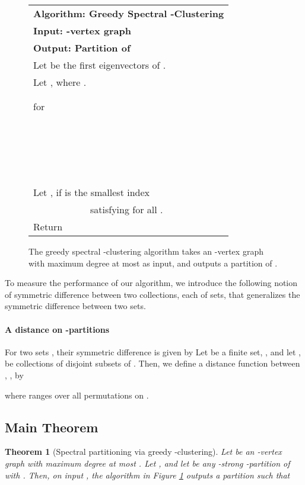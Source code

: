 \documentclass[11pt]{article}
\theoremstyle{plain}
\newtheorem{theorem}{Theorem}[section]
\begin{document}
\begin{figure}
\begin{center}
\begin{tabularx}{\textwidth}{l}
\toprule
\textbf{Algorithm: Greedy Spectral -Clustering}\\
\textbf{Input: -vertex graph }\\
\textbf{Output: Partition  of }\\
\midrule
Let  be the  first eigenvectors of . \\
Let , where . \\
 \\
 \\
for  \\
~~~~~~~~\\
~~~~~~~~~~~~ \\
~~~~~~~~ \\
~~~~~~~~ \\
Let ,  if  is the smallest index \\
~~~~~~~~~~~~satisfying  for all . \\
Return  \\
\bottomrule
\end{tabularx}
\end{center}
\caption{The greedy spectral -clustering algorithm takes an -vertex graph
 with maximum degree at most  as input, and
outputs a partition  of .
\label{fig:algorithm}}
\end{figure}

To measure the performance of our algorithm, we introduce the following notion
of symmetric difference between two collections, each of  sets, that
generalizes the symmetric difference between two sets.

\paragraph*{A distance on -partitions} For two sets , their
symmetric difference is given by  Let  be a finite set, , and let ,  be collections of
disjoint subsets of . Then, we define a distance function between ,
, by

where  ranges over all permutations  on .

\subsection{Main Theorem}

\begin{theorem}[Spectral partitioning via greedy -clustering]\label{thm:main}
Let  be an -vertex graph with maximum degree at most . Let , and let  be any -strong
-partition of  with . Then, on input , the algorithm in Figure
\ref{fig:algorithm} outputs a partition  such that

\end{theorem}
\end{document}
